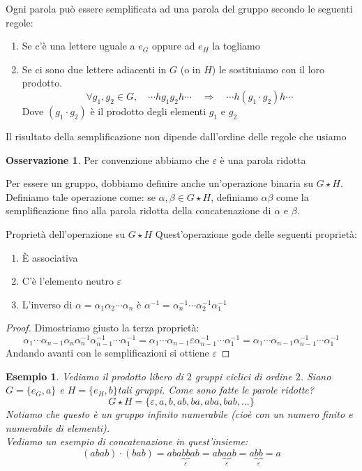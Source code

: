 \documentclass[11pt,a4paper,twoside]{article}
\newcommand{\vareps}{\varepsilon}
\newtheorem{es}{Esempio}
\theoremstyle{definition}
\newtheorem*{oss}{Osservazione}
\begin{document}
Ogni parola può essere semplificata ad una parola del gruppo secondo le seguenti regole:
\begin{enumerate}
	\item Se c'è una lettere uguale a $e_G$ oppure ad $e_H$ la togliamo
	\item Se ci sono due lettere adiacenti in $G$ (o in $H$) le sostituiamo con il loro prodotto.
		\[\forall g_1, g_2 \in G, \quad \cdots hg_1g_2h \cdots \quad \Rightarrow \quad \cdots h(g_1 \cdot g_2)h \cdots \]
		Dove $(g_1\cdot g_2)$ è il prodotto degli elementi $g_1$ e $g_2$
\end{enumerate}

\begin{thm}{}{}
	Il risultato della semplificazione non dipende dall'ordine delle regole che usiamo
\end{thm}

\begin{oss}
	Per convenzione abbiamo che $\vareps$ è una parola ridotta
\end{oss}

Per essere un gruppo, dobbiamo definire anche un'operazione binaria su $G \star H$. Definiamo tale operazione come: se $\alpha, \beta \in G \star H$, definiamo $\alpha\beta$ come la semplificazione fino alla parola ridotta della concatenazione di $\alpha$ e $\beta$.

\begin{prop}{Proprietà dell'operazione su $G\star H$}{}
	Quest'operazione gode delle seguenti proprietà:
	\begin{enumerate}
		\item È associativa
		\item C'è l'elemento neutro $\vareps$
		\item L'inverso di $\alpha = \alpha_1\alpha_2 \cdots \alpha_n$ è $\alpha^{-1} = \alpha_n^{-1}\cdots \alpha_2^{-1}\alpha_1^{-1}$
	\end{enumerate}
\end{prop}

\begin{proof}
	Dimostriamo giusto la terza proprietà:
	\[ \alpha_1\cdots \alpha_{n-1}\alpha_n\alpha_n^{-1}\alpha_{n-1}^{-1}\cdots \alpha_1^{-1} =  \alpha_1\cdots \alpha_{n-1}\vareps\alpha_{n-1}^{-1}\cdots \alpha_1^{-1} = \alpha_1\cdots \alpha_{n-1}\alpha_{n-1}^{-1}\cdots \alpha_1^{-1} \]
	Andando avanti con le semplificazioni si ottiene $\vareps$
\end{proof}

\begin{es}
	Vediamo il prodotto libero di $2$ gruppi ciclici di ordine $2$. Siano $G = \{ e_G, a\}$ e $H=\{e_H, b\}$tali gruppi. Come sono fatte le parole ridotte?
	\[G \star H = \{ \vareps, a, b, ab, ba, aba, bab,... \}\]
	Notiamo che questo è un gruppo infinito numerabile (cioè con un numero finito e numerabile di elementi).\\
	Vediamo un esempio di concatenazione in quest'insieme:
	\[ (abab)\cdot(bab) = aba\underbrace{bb}_\vareps ab = ab\underbrace{aa}_\vareps b = a\underbrace{bb}_\vareps = a \]
\end{es}
\end{document}
